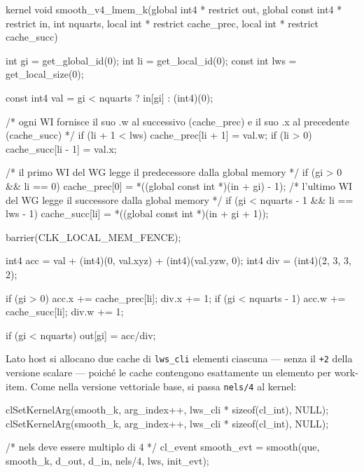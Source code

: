 \begin{code}[caption={Kernel smooth vettoriale con local memory}, label={code:smooth_v4_lmem_k}]
kernel void smooth_v4_lmem_k(global int4 * restrict out,
                              global const int4 * restrict in,
                              int nquarts,
                              local int * restrict cache_prec,
                              local int * restrict cache_succ)
{
    int gi = get_global_id(0);
    int li = get_local_id(0);
    const int lws = get_local_size(0);

    const int4 val = gi < nquarts ? in[gi] : (int4)(0);

    /* ogni WI fornisce il suo .w al successivo (cache_prec)
       e il suo .x al precedente (cache_succ) */
    if (li + 1 < lws) cache_prec[li + 1] = val.w;
    if (li > 0)       cache_succ[li - 1] = val.x;

    /* il primo WI del WG legge il predecessore dalla global memory */
    if (gi > 0 && li == 0)
        cache_prec[0] = *((global const int *)(in + gi) - 1);
    /* l'ultimo WI del WG legge il successore dalla global memory */
    if (gi < nquarts - 1 && li == lws - 1)
        cache_succ[li] = *((global const int *)(in + gi + 1));

    barrier(CLK_LOCAL_MEM_FENCE);

    int4 acc = val + (int4)(0, val.xyz) + (int4)(val.yzw, 0);
    int4 div = (int4)(2, 3, 3, 2);

    if (gi > 0) {
        acc.x += cache_prec[li];
        div.x += 1;
    }
    if (gi < nquarts - 1) {
        acc.w += cache_succ[li];
        div.w += 1;
    }

    if (gi < nquarts) out[gi] = acc/div;
}
\end{code}

Lato host si allocano due cache di \texttt{lws\_cli} elementi ciascuna — senza il \texttt{+2} della versione scalare — poiché le cache contengono esattamente un elemento per work-item. Come nella versione vettoriale base, si passa \texttt{nels/4} al kernel:

\begin{code}[caption={Allocazione delle due cache lato host (versione v4+lmem)}, label={code:smooth_host_v4lmem}]
clSetKernelArg(smooth_k, arg_index++, lws_cli * sizeof(cl_int), NULL);
clSetKernelArg(smooth_k, arg_index++, lws_cli * sizeof(cl_int), NULL);

/* nels deve essere multiplo di 4 */
cl_event smooth_evt = smooth(que, smooth_k, d_out, d_in,
                              nels/4, lws, init_evt);
\end{code}

